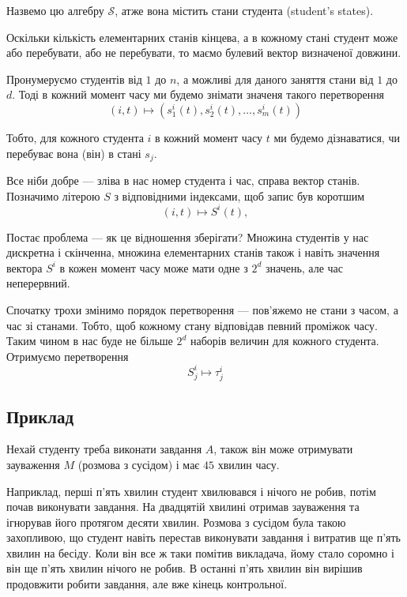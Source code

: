 Назвемо цю алгебру $\mathcal{S}$, атже вона містить стани студента
(student's states).

Оскільки кількість елементарних станів кінцева, а в кожному стані студент
може або перебувати, або не перебувати, то маємо булевий вектор визначеної
довжини.

Пронумеруємо студентів від $1$ до $n$, а можливі для даного заняття стани
від $1$ до $d$.
Тоді в кожний момент часу ми будемо знімати значеня такого перетворення
\begin{equation*}
  \left( i,t \right) \mapsto \left( s_1^i\left( t \right),
    s_2^i\left( t \right), \dots, s_m^i\left( t \right) \right)
\end{equation*}

Тобто, для кожного студента $i$ в кожний момент часу $t$ ми будемо
дізнаватися, чи перебуває вона (він) в стані $s_j$.

Все ніби добре --- зліва в нас номер студента і час, справа вектор станів.
Позначимо літерою $S$ з відповідними індексами, щоб запис був коротшим
\begin{equation*}
  \left( i,t \right) \mapsto S^i\left( t \right),
\end{equation*}

Постає проблема --- як це відношення зберігати?
Множина студентів у нас дискретна і скінченна, множина елементарних станів
також і навіть значення вектора $S^i$ в кожен момент часу може мати одне з
$2^d$ значень, але час неперервний.

Спочатку трохи змінимо порядок перетворення --- пов’яжемо не стани з часом,
а час зі станами.
Тобто, щоб кожному стану відповідав певний проміжок часу.
Таким чином в нас буде не більше $2^d$ наборів величин для кожного студента.
Отримуємо перетворення
\begin{equation}\label{eq:stateMapsToTime}
  S_j^i \mapsto \tau_j^i
\end{equation}

\subsection{Приклад}
Нехай студенту треба виконати завдання $A$, також він може отримувати зауваження
$M$ (розмова з сусідом) і має $45$ хвилин часу.

Наприклад, перші п’ять хвилин студент хвилювався і нічого не робив, потім
почав виконувати завдання.
На двадцятій хвилині отримав зауваження та ігнорував його протягом десяти
хвилин.
Розмова з сусідом була такою захопливою, що студент навіть перестав виконувати
завдання і витратив ще п’ять хвилин на бесіду.
Коли він все ж таки помітив викладача, йому стало соромно і він ще п’ять хвилин
нічого не робив.
В останні п’ять хвилин він вирішив продовжити робити завдання, але вже кінець
контрольної.

